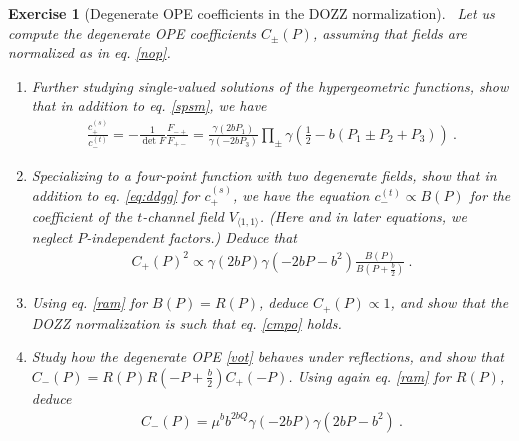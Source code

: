 \documentclass[12pt, a4paper, notitlepage, twoside]{report}
\numberwithin{equation}{section}
\theoremstyle{break}
\newtheorem{exo}{Exercise}[chapter]
\begin{document}
\begin{exo}[Degenerate OPE coefficients in the DOZZ normalization]
 ~\label{exodoc}
 Let us compute the degenerate OPE coefficients $C_\pm(P)$, assuming that fields are normalized as in eq. \eqref{nop}.
\begin{enumerate}
 \item Further studying single-valued solutions of the hypergeometric functions, show that in addition to eq. \eqref{spsm}, we have 
 \begin{align}
  \frac{c_+^{(s)}}{c_-^{(t)}} = -\frac{1}{\det F}\frac{F_{-+}}{F_{+-}} = \frac{\gamma(2bP_1)}{\gamma(-2bP_3)}\prod_\pm \gamma\left(\tfrac12-b(P_1\pm P_2+P_3)\right)\ .
 \end{align}
\item Specializing to a four-point function with two degenerate fields,
show that in addition to eq. \eqref{eq:ddgg} for $c_+^{(s)}$, we have the equation
$
 c_-^{(t)} \propto B(P)
$ for the coefficient of the $t$-channel field $V_{\langle 1,1\rangle}$. 
(Here and in later equations, 
we neglect $P$-independent factors.) Deduce that 
\begin{align}
 C_+(P)^2 \propto \gamma(2bP)\gamma(-2bP-b^2) \frac{B(P)}{B(P+\frac{b}{2})}\ .
\end{align}
\item Using eq. \eqref{ram} for $B(P)=R(P)$, deduce $C_+(P)\propto 1$, and show that the DOZZ normalization is such that eq. \eqref{cmpo} holds. 
\item
Study how the degenerate OPE \eqref{vot} behaves under reflections, and show that $C_-(P) = R(P)R(-P+\frac{b}{2})C_+(-P)$. Using again eq. \eqref{ram} for $R(P)$, deduce
\begin{align}
 C_-(P) = \mu^b b^{2bQ} \gamma(-2bP)\gamma(2bP-b^2)\ .
\end{align}
\end{enumerate}
 \end{exo}
\end{document}
